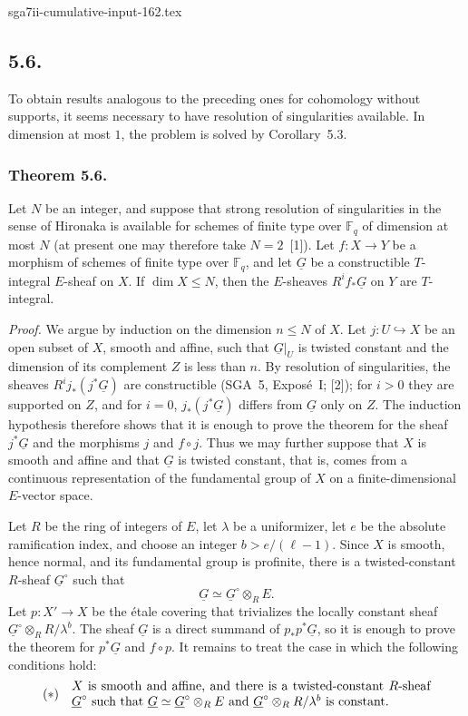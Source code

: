 \begin{filecontents*}{sga7ii-cumulative-input-162.tex}
\subsection*{5.6.}
To obtain results analogous to the preceding ones for cohomology without
supports, it seems necessary to have resolution of singularities available.
In dimension at most $1$, the problem is solved by Corollary~5.3.

\subsubsection*{Theorem 5.6.}
Let $N$ be an integer, and suppose that strong resolution of singularities
in the sense of Hironaka is available for schemes of finite type over
$\mathbb F_q$ of dimension at most $N$ (at present one may therefore take
$N=2$~[1]).  Let $f:X\longrightarrow Y$ be a morphism of schemes of finite
type over $\mathbb F_q$, and let $\underline G$ be a constructible
$T$-integral $E$-sheaf on $X$.  If $\dim X\leq N$, then the $E$-sheaves
$R^if_*\underline G$ on $Y$ are $T$-integral.

\medskip
\noindent\emph{Proof.}
We argue by induction on the dimension $n\leq N$ of $X$.  Let
$j:U\hookrightarrow X$ be an open subset of $X$, smooth and affine, such
that $\underline G|_U$ is twisted constant and the dimension of its
complement $Z$ is less than $n$.  By resolution of singularities, the
sheaves $R^ij_*(j^*\underline G)$ are constructible
(SGA~5, Expos\'e~I; [2]); for $i>0$ they are supported on $Z$, and for
$i=0$, $j_*(j^*\underline G)$ differs from $\underline G$ only on $Z$.
The induction hypothesis therefore shows that it is enough to prove the
theorem for the sheaf $j^*\underline G$ and the morphisms $j$ and
$f\circ j$.  Thus we may further suppose that $X$ is smooth and affine and
that $\underline G$ is twisted constant, that is, comes from a continuous
representation of the fundamental group of $X$ on a finite-dimensional
$E$-vector space.

Let $R$ be the ring of integers of $E$, let $\lambda$ be a uniformizer, let
$e$ be the absolute ramification index, and choose an integer
$b>e/(\ell-1)$.  Since $X$ is smooth, hence normal, and its fundamental
group is profinite, there is a twisted-constant $R$-sheaf
$\underline G^\circ$ such that
\[
\underline G\simeq\underline G^\circ\otimes_R E.
\]
Let $p:X'\longrightarrow X$ be the \'etale covering that trivializes the
locally constant sheaf
$\underline G^\circ\otimes_R R/\lambda^b$.  The sheaf $\underline G$ is a
direct summand of $p_*p^*\underline G$, so it is enough to prove the theorem
for $p^*\underline G$ and $f\circ p$.  It remains to treat the case in which
the following conditions hold:
\[
(*)\quad
\begin{minipage}{0.82\linewidth}
$X$ is smooth and affine, and there is a twisted-constant $R$-sheaf
$\underline G^\circ$ such that
$\underline G\simeq\underline G^\circ\otimes_R E$ and
$\underline G^\circ\otimes_R R/\lambda^b$ is constant.
\end{minipage}
\]


\end{filecontents*}
